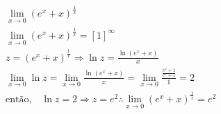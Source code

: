 \begin{ex}
\begin{align}
&\lim_{x\rightarrow 0} (e^{x}+x)^{\frac{1}{x}}\nonumber\\
&\lim_{x\rightarrow 0} (e^{x}+x)^{\frac{1}{x}}=[1]^\infty\nonumber\\
&z=(e^{x}+x)^{\frac{1}{x}} \Rightarrow \ln{z}=\frac{\ln(e^{x}+x)}{x}\nonumber\\
&\lim_{x\rightarrow 0} \ln{z}= \lim_{x\rightarrow 0} \frac{\ln{(e^{x}+x)}}{x}= \lim_{x\rightarrow 0} \frac{\frac{e^{x}+1}{e^{x}+1}}{1}= 2\nonumber\\
&\text{então,}\quad \ln{z}=2 \Rightarrow z=e^2 \therefore \lim_{x\rightarrow 0} (e^{x}+x)^{\frac{1}{x}}=e^2\nonumber
\end{align}
\end{ex}

